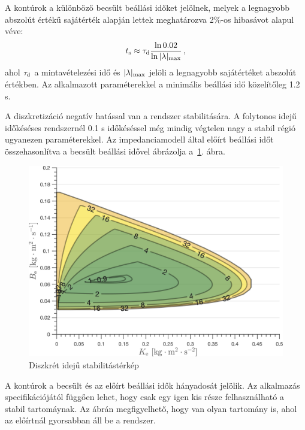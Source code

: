 A kontúrok a különböző becsült beállási időket jelölnek, melyek a legnagyobb abszolút értékű sajátérték 
alapján lettek meghatározva 2\%-os hibasávot alapul véve:
\begin{align}
    \begin{split}
        t_{\mathrm{s}} \approx \tau_{\mathrm{d}} \frac{\ln{0.02}}{\ln{|\lambda|_{\mathrm{max}}}}\,,
    \end{split}        
\end{align}
ahol \(\tau_{\mathrm{d}}\) a mintavételezési idő és \(|\lambda|_{\mathrm{max}}\) jelöli a legnagyobb sajátértéket 
abszolút értékben. Az alkalmazott paraméterekkel a minimális beállási idő közelítőleg 1.2 s. 

A diszkretizáció negatív hatással van a rendszer stabilitására. A folytonos idejű időkéséses rendszernél 0.1 s 
időkéséssel még mindig végtelen nagy a stabil régió ugyanezen paraméterekkel. Az impedanciamodell által 
előírt beállási időt összehasonlítva a becsült beállási idővel ábrázolja a~\ref{fig:time_delay_stab_map_discrete_diff}.
ábra.

\begin{figure}[H]
    \begin{center}
    \includegraphics[width=\textwidth]{images/time_delay_stab_map_discrete_diff.png}
    \caption{Diszkrét idejű stabilitástérkép}\label{fig:time_delay_stab_map_discrete_diff}
    \end{center}
\end{figure}

A kontúrok a becsült és az előírt beállási idők hányadosát jelölik. Az alkalmazás specifikációjától függően lehet, 
hogy csak egy igen kis része felhasználható a stabil tartomáynak. Az ábrán megfigyelhető, hogy van olyan tartomány is, 
ahol az előírtnál gyorsabban áll be a rendszer.

